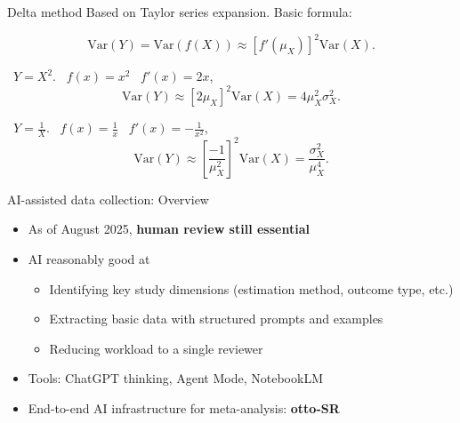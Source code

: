 \documentclass{beamer} %
\begin{document}
\begin{frame}{Delta method}
Based on Taylor series expansion. Basic formula:

\[
\text{Var}(Y) = \text{Var}(f(X)) \approx [f'(\mu_X)]^2 \text{Var}(X).
\]


\bigskip

\underline{} \,  $Y = X^2$. \,  $f(x) = x^2$ \,  $f'(x) = 2x$, \, 
\[
\text{Var}(Y) \approx [2\mu_X]^2 \text{Var}(X) = 4\mu_X^2\sigma_X^2.
\]

\underline{} \,  $Y = \frac{1}{X}$. \,  $f(x) = \frac{1}{x}$ \,  $f'(x) = -\frac{1}{x^2}$, \, 
\[
\text{Var}(Y) \approx \left[\frac{-1}{\mu_X^2}\right]^2 \text{Var}(X) = \frac{\sigma_X^2}{\mu_X^4}.
\]



\end{frame}



\begin{frame}{AI-assisted data collection: Overview}
\begin{itemize}
  \item As of August 2025, \textbf{human review still essential}
  \item AI reasonably good at \\
	
	\smallskip
	
  \begin{itemize}
    \item Identifying key study dimensions (estimation method, outcome type, etc.)
    \item Extracting basic data with structured prompts and examples
    \item Reducing workload to a single reviewer
  \end{itemize}
	
		
	\smallskip
	
  \item Tools: ChatGPT thinking, Agent Mode, NotebookLM
  \item End-to-end AI infrastructure for meta-analysis: \textbf{otto-SR}
\end{itemize}
\end{frame}
\end{document}
